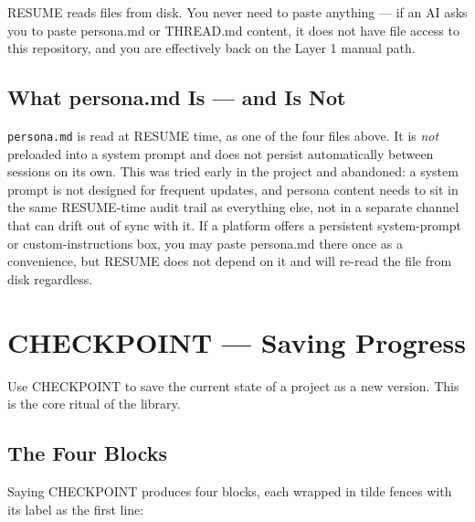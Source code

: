 \documentclass[12pt,letterpaper]{article}
\begin{document}
\begin{mdframed}[style=notebox]
RESUME reads files from disk. You never need to paste anything --- if an
AI asks you to paste persona.md or THREAD.md content, it does not have
file access to this repository, and you are effectively back on the
Layer 1 manual path.
\end{mdframed}

\subsection{What persona.md Is --- and Is Not}

\texttt{persona.md} is read at RESUME time, as one of the four files
above. It is \emph{not} preloaded into a system prompt and does not
persist automatically between sessions on its own. This was tried early
in the project and abandoned: a system prompt is not designed for
frequent updates, and persona content needs to sit in the same
RESUME-time audit trail as everything else, not in a separate channel
that can drift out of sync with it. If a platform offers a persistent
system-prompt or custom-instructions box, you may paste persona.md there
once as a convenience, but RESUME does not depend on it and will re-read
the file from disk regardless.

\section{CHECKPOINT --- Saving Progress}

Use CHECKPOINT to save the current state of a project as a new version.
This is the core ritual of the library.

\subsection{The Four Blocks}

Saying CHECKPOINT produces four blocks, each wrapped in tilde fences with
its label as the first line:
\end{document}
